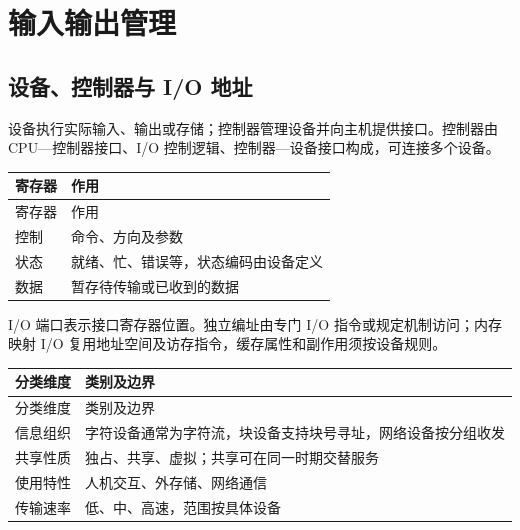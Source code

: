 \chapter{输入输出管理}\label{OS05}

\section{设备、控制器与 I/O 地址}\label{OS05-devices}

设备执行实际输入、输出或存储；控制器管理设备并向主机提供接口。控制器由 CPU---控制器接口、I/O 控制逻辑、控制器---设备接口构成，可连接多个设备。

\par\smallskip
{\fontsize{9.3}{12}\selectfont\setlength{\tabcolsep}{2.5pt}\setlength{\LTleft}{0pt}\setlength{\LTright}{0pt}
\begin{longtable}{@{}>{\raggedright\arraybackslash}p{}>{\raggedright\arraybackslash}p{}@{}}
\toprule
寄存器 & 作用 \\

\midrule\endfirsthead\toprule
寄存器 & 作用 \\

\midrule\endhead\bottomrule\endfoot
控制 & 命令、方向及参数 \\

状态 & 就绪、忙、错误等，状态编码由设备定义 \\

数据 & 暂存待传输或已收到的数据 \\

\end{longtable}}
\par\smallskip

I/O 端口表示接口寄存器位置。独立编址由专门 I/O 指令或规定机制访问；内存映射 I/O 复用地址空间及访存指令，缓存属性和副作用须按设备规则。

\par\smallskip
{\fontsize{9.3}{12}\selectfont\setlength{\tabcolsep}{2.5pt}\setlength{\LTleft}{0pt}\setlength{\LTright}{0pt}
\begin{longtable}{@{}>{\raggedright\arraybackslash}p{}>{\raggedright\arraybackslash}p{}@{}}
\toprule
分类维度 & 类别及边界 \\

\midrule\endfirsthead\toprule
分类维度 & 类别及边界 \\

\midrule\endhead\bottomrule\endfoot
信息组织 & 字符设备通常为字符流，块设备支持块号寻址，网络设备按分组收发 \\

共享性质 & 独占、共享、虚拟；共享可在同一时期交替服务 \\

使用特性 & 人机交互、外存储、网络通信 \\

传输速率 & 低、中、高速，范围按具体设备 \\

\end{longtable}}
\par\smallskip

